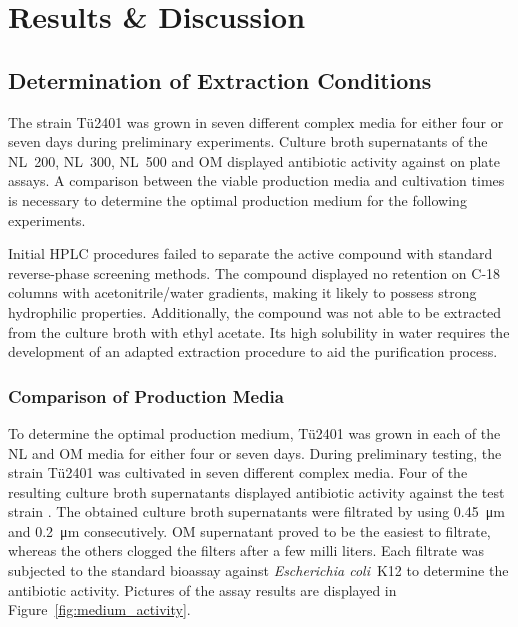 
\chapter{Results \& Discussion}

\section{Determination of Extraction Conditions} %
\label{sec:determination_of_extraction_conditions}

The strain Tü2401 was grown in seven different complex media for either four or seven days during preliminary experiments.
Culture broth supernatants of the NL~200, NL~300, NL~500 and OM displayed antibiotic activity against \coli  on plate assays.
A comparison between the viable production media and cultivation times is necessary to determine the optimal production medium for the following experiments.

Initial HPLC procedures failed to separate the active compound with standard reverse-phase screening methods. The compound displayed no retention on C-18 columns with acetonitrile/water gradients, making it likely to possess strong hydrophilic properties.
Additionally, the compound was not able to be extracted from the culture broth with ethyl acetate. Its high solubility in water requires the development of an adapted extraction procedure to aid the purification process.

\subsection{Comparison of Production Media} %
\label{sub:comparison_of_production_media}

To determine the optimal production medium, Tü2401 was grown in each of the NL and OM media for either four or seven days.
During preliminary testing, the strain Tü2401 was cultivated in seven different complex media.
Four of the resulting culture broth supernatants displayed antibiotic activity against the test strain \coli.
The obtained culture broth supernatants were filtrated by using \SI{0.45}{\micro\meter} and \SI{0.2}{\micro\meter} consecutively.
OM supernatant proved to be the easiest to filtrate, whereas the others clogged the filters after a few milli liters.
Each filtrate was subjected to the standard bioassay against \textit{Escherichia coli}~K12 to determine the antibiotic activity.
Pictures of the assay results are displayed in Figure~\ref{fig:medium_activity}.

